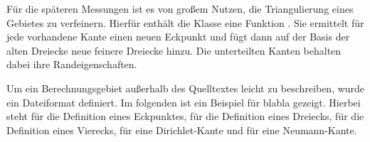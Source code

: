 \documentclass[crop=false,10pt,ngerman]{standalone}
\begin{document}
      Für die späteren Messungen ist es von großem Nutzen, die Triangulierung eines Gebietes zu verfeinern.
      Hierfür enthält die Klasse  eine Funktion .
      Sie ermittelt für jede vorhandene Kante einen neuen Eckpunkt und fügt dann auf der Basis der alten Dreiecke neue feinere Dreiecke hinzu.
      Die unterteilten Kanten behalten dabei ihre Randeigenschaften.

      Um ein Berechnungsgebiet außerhalb des Quelltextes leicht zu beschreiben, wurde ein Dateiformat definiert.
      Im folgenden ist ein Beispiel für blabla gezeigt.
      Hierbei steht  für die Definition eines Eckpunktes,  für die Definition eines Dreiecks,  für die Definition eines Vierecks,  für eine Dirichlet-Kante und  für eine Neumann-Kante.
      \begin{center}
        \noindent
        \begin{minipage}[b]{0.32\textwidth}
          \begin{tcolorbox}[titlerule=0.1pt,boxrule=0.5pt,arc=5pt,title={Zeile 1-13}]
            
          \end{tcolorbox}
        \end{minipage}
        \hfill
        \begin{minipage}[b]{0.32\textwidth}
          \begin{tcolorbox}[titlerule=0.1pt,boxrule=0.5pt,arc=5pt,title={Zeile 14-26}]
            
          \end{tcolorbox}
        \end{minipage}
        \hfill
        \begin{minipage}[b]{0.32\textwidth}
          \begin{tcolorbox}[titlerule=0.1pt,boxrule=0.5pt,arc=5pt,title={Zeile 27-39}]
            
          \end{tcolorbox}
        \end{minipage}
      \end{center}
\end{document}
